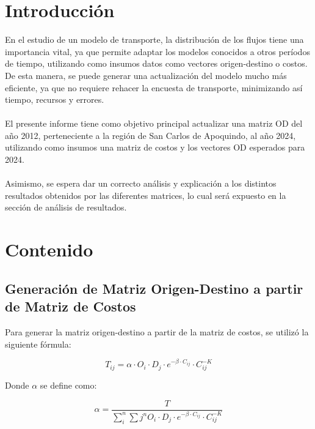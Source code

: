 \documentclass[12pt]{article} %
\begin{document}
\setcounter{page}{1}
\section{Introducción}

En el estudio de un modelo de transporte, la distribución de los flujos tiene una importancia vital, ya que permite adaptar los modelos conocidos a otros períodos de tiempo, utilizando como insumos datos como vectores origen-destino o costos. De esta manera, se puede generar una actualización del modelo mucho más eficiente, ya que no requiere rehacer la encuesta de transporte, minimizando así tiempo, recursos y errores.
\\ \\
El presente informe tiene como objetivo principal actualizar una matriz OD del año 2012, perteneciente a la región de San Carlos de Apoquindo, al año 2024, utilizando como insumos una matriz de costos y los vectores OD esperados para 2024.
\\ \\
Asimismo, se espera dar un correcto análisis y explicación a los distintos resultados obtenidos por las diferentes matrices, lo cual será expuesto en la sección de análisis de resultados.

\section{Contenido}
\subsection{Generación de Matriz Origen-Destino a partir de Matriz de Costos}

Para generar la matriz origen-destino a partir de la matriz de costos, se utilizó la siguiente fórmula:

\begin{equation}
  T_{ij} = \alpha \cdot O_i \cdot D_j \cdot e^{-\beta \cdot C_{ij}} \cdot C_{ij}^{-K}
\end{equation}

Donde \(\alpha\) se define como:

\begin{equation}
  \alpha = \frac{T}{\sum_{i}^{n} \sum{j}^{n} O_i \cdot D_j \cdot e^{-\beta \cdot C_{ij}} \cdot C_{ij}^{-K}}
\end{equation}
\end{document}
